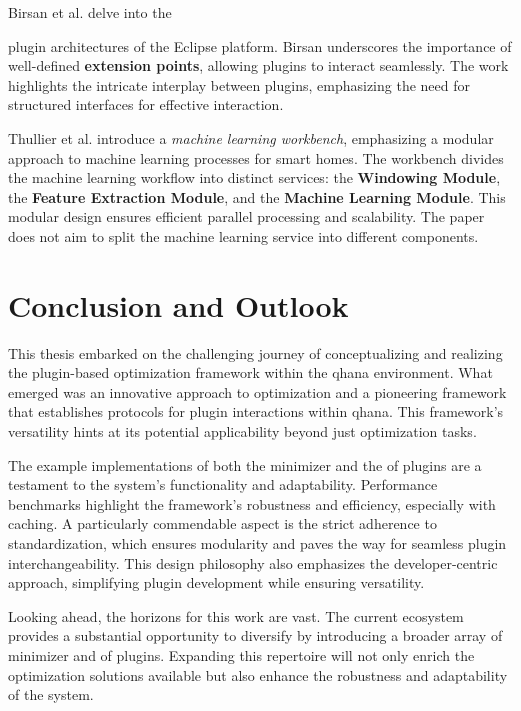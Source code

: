 \documentclass[
  a4paper,  %
  twoside,  %
  bibliography=totoc,
  headsepline,
  cleardoublepage=empty,
  parskip=half,
  draft=false
]{scrbook}
\begin{document}
Birsan et al. \cite{Birsan2005} delve into the {plugin architectures of the Eclipse platform.
Birsan underscores the importance of well-defined \textbf{extension points}, allowing plugins to interact seamlessly.
The work highlights the intricate interplay between plugins, emphasizing the need for structured interfaces for effective interaction.

Thullier et al. \cite{Thullier2021} introduce a \emph{machine learning workbench}, emphasizing a modular approach to machine learning processes for smart homes.
The workbench divides the machine learning workflow into distinct services: the \textbf{Windowing Module}, the \textbf{Feature Extraction Module}, and the \textbf{Machine Learning Module}.
This modular design ensures efficient parallel processing and scalability.
The paper does not aim to split the machine learning service into different components.


\chapter{Conclusion and Outlook}
\label{chap:conclusion}

This thesis embarked on the challenging journey of conceptualizing and realizing the plugin-based optimization framework within the \gls{qhana} environment.
What emerged was an innovative approach to optimization and a pioneering framework that establishes protocols for plugin interactions within \gls{qhana}.
This framework's versatility hints at its potential applicability beyond just optimization tasks.

The example implementations of both the minimizer and the \gls{of} plugins are a testament to the system's functionality and adaptability.
Performance benchmarks highlight the framework's robustness and efficiency, especially with caching.
A particularly commendable aspect is the strict adherence to standardization, which ensures modularity and paves the way for seamless plugin interchangeability.
This design philosophy also emphasizes the developer-centric approach, simplifying plugin development while ensuring versatility.

Looking ahead, the horizons for this work are vast.
The current ecosystem provides a substantial opportunity to diversify by introducing a broader array of minimizer and \gls{of} plugins.
Expanding this repertoire will not only enrich the optimization solutions available but also enhance the robustness and adaptability of the system.

}
\end{document}
